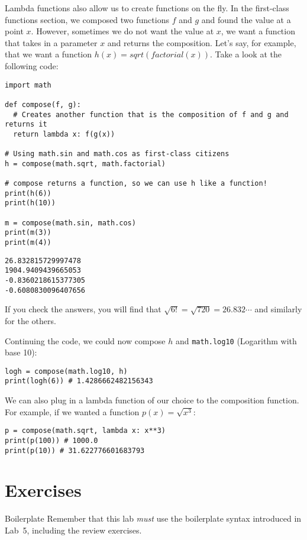 \documentclass[11pt]{cselabheader}
\begin{document}
Lambda functions also allow us to create functions on the fly. In the
first-class functions section, we composed two functions $f$ and $g$ and found
the value at a point $x$. However, sometimes we do not want the value at $x$, we
want a function that takes in a parameter $x$ and returns the composition. Let's
say, for example, that we want a function $h(x) = sqrt(factorial(x))$. Take
a look at the following code:
\begin{lstlisting}[style=python]
import math

def compose(f, g):
  # Creates another function that is the composition of f and g and returns it
  return lambda x: f(g(x))

# Using math.sin and math.cos as first-class citizens
h = compose(math.sqrt, math.factorial)

# compose returns a function, so we can use h like a function!
print(h(6))
print(h(10))

m = compose(math.sin, math.cos)
print(m(3))
print(m(4))
\end{lstlisting}

\begin{lstlisting}[style=bash]
26.832815729997478
1904.9409439665053
-0.8360218615377305
-0.6080830096407656
\end{lstlisting}

If you check the answers, you will find that $\sqrt{ 6! } = \sqrt{ 720 } =
26.832\cdots$ and similarly for the others.

Continuing the code, we could now compose $h$ and \lstinline!math.log10!
(Logarithm with base 10):
\begin{lstlisting}
logh = compose(math.log10, h)
print(logh(6)) # 1.4286662482156343
\end{lstlisting}

We can also plug in a lambda function of our choice to the composition function.
For example, if we wanted a function $p(x) = \sqrt{ x^3 }$:
\begin{lstlisting}
p = compose(math.sqrt, lambda x: x**3)
print(p(100)) # 1000.0
print(p(10)) # 31.622776601683793
\end{lstlisting}

\pagebreak

\section{Exercises}
\label{sec:ex}

\begin{warningbox}{Boilerplate}
  Remember that this lab \emph{must} use the
  boilerplate syntax introduced in Lab~5, including the review exercises.
\end{warningbox}
\end{document}
